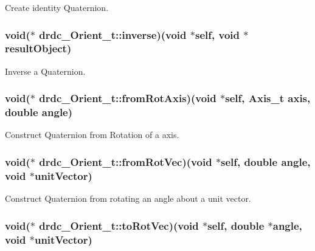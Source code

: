 Create identity Quaternion. 

\hypertarget{structdrdc__Orient__t_5763d3a77beab92499ad9b34372ff0a1}{
\subsubsection[inverse]{\setlength{\rightskip}{0pt plus 5cm}void($\ast$ {\bf drdc\_\-Orient\_\-t::inverse})(void $\ast$self, void $\ast$resultObject)}}
\label{structdrdc__Orient__t_5763d3a77beab92499ad9b34372ff0a1}


Inverse a Quaternion. 

\hypertarget{structdrdc__Orient__t_900a9fe69012056dbee9f166650e777a}{
\subsubsection[fromRotAxis]{\setlength{\rightskip}{0pt plus 5cm}void($\ast$ {\bf drdc\_\-Orient\_\-t::fromRotAxis})(void $\ast$self, {\bf Axis\_\-t} axis, double angle)}}
\label{structdrdc__Orient__t_900a9fe69012056dbee9f166650e777a}


Construct Quaternion from Rotation of a axis. 

\hypertarget{structdrdc__Orient__t_6ee726277b61039e7de0cc29099e8fe2}{
\subsubsection[fromRotVec]{\setlength{\rightskip}{0pt plus 5cm}void($\ast$ {\bf drdc\_\-Orient\_\-t::fromRotVec})(void $\ast$self, double angle, void $\ast$unitVector)}}
\label{structdrdc__Orient__t_6ee726277b61039e7de0cc29099e8fe2}


Construct Quaternion from rotating an angle about a unit vector. 

\hypertarget{structdrdc__Orient__t_12f7b4fd36f95a7aaf65c938c2ade0ca}{
\subsubsection[toRotVec]{\setlength{\rightskip}{0pt plus 5cm}void($\ast$ {\bf drdc\_\-Orient\_\-t::toRotVec})(void $\ast$self, double $\ast$angle, void $\ast$unitVector)}}
\label{structdrdc__Orient__t_12f7b4fd36f95a7aaf65c938c2ade0ca}


